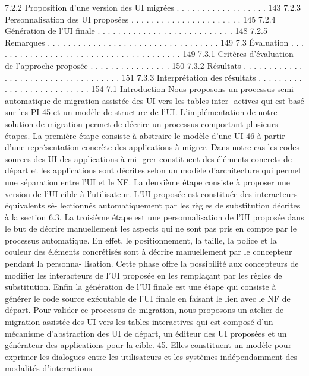 \documentclass{article}
\begin{document}
7.2.2
Proposition d’une version des UI migrées . . . . . . . . . . . . . . . . . . 143
7.2.3
Personnalisation des UI proposées . . . . . . . . . . . . . . . . . . . . . . 145
7.2.4
Génération de l’UI ﬁnale . . . . . . . . . . . . . . . . . . . . . . . . . . . 148
7.2.5
Remarques . . . . . . . . . . . . . . . . . . . . . . . . . . . . . . . . . . 149
7.3
Évaluation . . . . . . . . . . . . . . . . . . . . . . . . . . . . . . . . . . . . . . 149
7.3.1
Critères d’évaluation de l’approche proposée . . . . . . . . . . . . . . . . 150
7.3.2
Résultats
. . . . . . . . . . . . . . . . . . . . . . . . . . . . . . . . . . . 151
7.3.3
Interprétation des résultats . . . . . . . . . . . . . . . . . . . . . . . . . . 154
7.1
Introduction
Nous proposons un processus semi automatique de migration assistée des UI vers les tables inter-
actives qui est basé sur les PI 45 et un modèle de structure de l’UI. L’implémentation de notre solution
de migration permet de décrire un processus comportant plusieurs étapes.
La première étape consiste à abstraire le modèle d’une UI 46 à partir d’une représentation
concrète des applications à migrer. Dans notre cas les codes sources des UI des applications à mi-
grer constituent des éléments concrets de départ et les applications sont décrites selon un modèle
d’architecture qui permet une séparation entre l’UI et le NF. La deuxième étape consiste à proposer
une version de l’UI cible à l’utilisateur. L’UI proposée est constituée des interacteurs équivalents sé-
lectionnés automatiquement par les règles de substitution décrites à la section 6.3. La troisième étape
est une personnalisation de l’UI proposée dans le but de décrire manuellement les aspects qui ne sont
pas pris en compte par le processus automatique. En effet, le positionnement, la taille, la police et la
couleur des éléments concrétisés sont à décrire manuellement par le concepteur pendant la personna-
lisation. Cette phase offre la possibilité aux concepteurs de modiﬁer les interacteurs de l’UI proposée
en les remplaçant par les règles de substitution. Enﬁn la génération de l’UI ﬁnale est une étape qui
consiste à générer le code source exécutable de l’UI ﬁnale en faisant le lien avec le NF de départ.
Pour valider ce processus de migration, nous proposons un atelier de migration assistée des UI
vers les tables interactives qui est composé d’un mécanisme d’abstraction des UI de départ, un éditeur
des UI proposées et un générateur des applications pour la cible.
45. Elles constituent un modèle pour exprimer les dialogues entre les utilisateurs et les systèmes indépendamment des
modalités d’interactions
\end{document}
